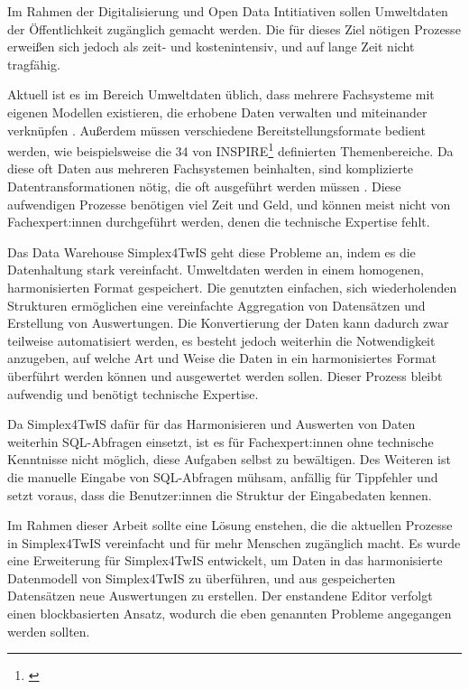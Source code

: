 Im Rahmen der Digitalisierung und Open Data Intitiativen sollen Umweltdaten der Öffentlichkeit zugänglich gemacht werden. Die für dieses Ziel nötigen Prozesse erweißen sich jedoch als zeit- und kostenintensiv, und auf lange Zeit nicht tragfähig.

Aktuell ist es im Bereich Umweltdaten üblich, dass mehrere Fachsysteme mit eigenen Modellen existieren, die erhobene Daten verwalten und miteinander verknüpfen \parencite{grossmannEnvVisioUniverselle2021}. Außerdem müssen verschiedene Bereitstellungsformate bedient werden, wie beispielsweise die 34 von INSPIRE\footnote{\textcite{inspireRichtlinie20072007}} definierten Themenbereiche. Da diese oft Daten aus mehreren Fachsystemen beinhalten, sind komplizierte Datentransformationen nötig, die oft ausgeführt werden müssen \parencite{grossmannEnvVisioUniverselle2021}. Diese aufwendigen Prozesse benötigen viel Zeit und Geld, und können meist nicht von Fachexpert:innen durchgeführt werden, denen die technische Expertise fehlt.

Das Data Warehouse Simplex4TwIS geht diese Probleme an, indem es die Datenhaltung stark vereinfacht. Umweltdaten werden in einem homogenen, harmonisierten Format gespeichert. Die genutzten einfachen, sich wiederholenden Strukturen ermöglichen eine vereinfachte Aggregation von Datensätzen und Erstellung von Auswertungen. Die Konvertierung der Daten kann dadurch zwar teilweise automatisiert werden, es besteht jedoch weiterhin die Notwendigkeit anzugeben, auf welche Art und Weise die Daten in ein harmonisiertes Format überführt werden können und ausgewertet werden sollen. Dieser Prozess bleibt aufwendig und benötigt technische Expertise.

Da Simplex4TwIS dafür für das Harmonisieren und Auswerten von Daten weiterhin \acs{SQL}-Abfragen einsetzt, ist es für Fachexpert:innen ohne technische Kenntnisse nicht möglich, diese Aufgaben selbst zu bewältigen. Des Weiteren ist die manuelle Eingabe von \acs{SQL}-Abfragen mühsam, anfällig für Tippfehler und setzt voraus, dass die Benutzer:innen die Struktur der Eingabedaten kennen.

\pskip
Im Rahmen dieser Arbeit sollte eine Lösung enstehen, die die aktuellen Prozesse in Simplex4TwIS vereinfacht und für mehr Menschen zugänglich macht. Es wurde eine Erweiterung für Simplex4TwIS entwickelt, um Daten in das harmonisierte Datenmodell von Simplex4TwIS zu überführen, und aus gespeicherten Datensätzen neue Auswertungen zu erstellen. Der enstandene Editor verfolgt einen blockbasierten Ansatz, wodurch die eben genannten Probleme angegangen werden sollten.

